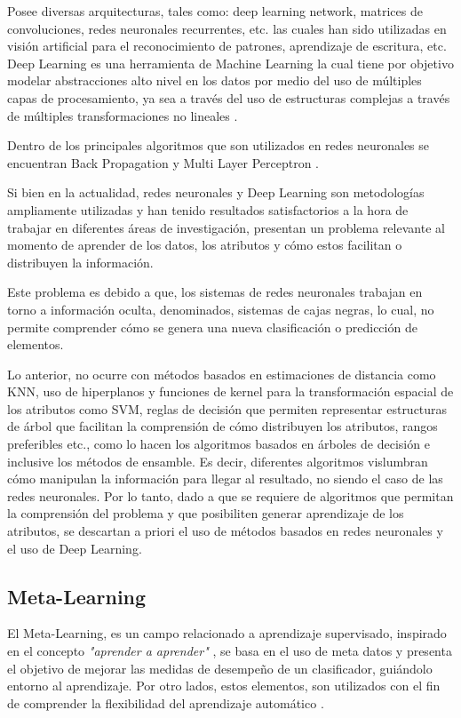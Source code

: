 Posee diversas arquitecturas, tales como: deep learning network, matrices de convoluciones, redes neuronales recurrentes, etc. las cuales han sido utilizadas en visión artificial para el reconocimiento de patrones, aprendizaje de escritura, etc. Deep Learning es una herramienta de Machine Learning la cual tiene por objetivo modelar abstracciones alto nivel en los datos por medio del uso de múltiples capas de procesamiento, ya sea a través del uso de estructuras complejas a través de múltiples transformaciones no lineales \cite{arel2010deep}.

Dentro de los principales algoritmos que son utilizados en redes neuronales se encuentran Back Propagation \cite{HECHTNIELSEN199265} y Multi Layer Perceptron \cite{80266}.

Si bien en la actualidad, redes neuronales y Deep Learning son metodologías ampliamente utilizadas y han tenido resultados satisfactorios a la hora de trabajar en diferentes áreas de investigación, presentan un problema relevante al momento de aprender de los datos, los atributos y cómo estos facilitan o distribuyen la información.

Este problema es debido a que, los sistemas de redes neuronales trabajan en torno a información oculta, denominados, sistemas de cajas negras, lo cual, no permite comprender cómo se genera una nueva clasificación o predicción de elementos. 

Lo anterior, no ocurre con métodos basados en estimaciones de distancia como KNN, uso de hiperplanos y funciones de kernel para la transformación espacial de los atributos como SVM, reglas de decisión que permiten representar estructuras de árbol que facilitan la comprensión de cómo distribuyen los atributos, rangos preferibles etc., como lo hacen los algoritmos basados en árboles de decisión e inclusive los métodos de ensamble. Es decir, diferentes algoritmos vislumbran cómo manipulan la información para llegar al resultado, no siendo el caso de las redes neuronales. Por lo tanto, dado a que se requiere de algoritmos que permitan la comprensión del problema y que posibiliten generar aprendizaje de los atributos, se descartan a priori el uso de métodos basados en redes neuronales y el uso de Deep Learning.

\subsection{Meta-Learning}

El Meta-Learning, es un campo relacionado a aprendizaje supervisado, inspirado en el concepto \textit{"aprender a aprender"} \cite{schmidhuber1987evolutionary}, se basa en el uso de meta datos y presenta el objetivo de mejorar las medidas de desempeño de un clasificador, guiándolo entorno al aprendizaje. Por otro lados, estos elementos, son utilizados con el fin de comprender la flexibilidad del aprendizaje automático \cite{utgoff1986shift}.

